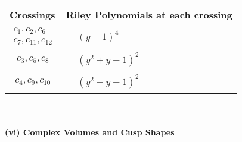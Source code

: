 \documentclass[1p]{elsarticle_modified}
\theoremstyle{definition}
\begin{document}
\begin{tabular}{m{50pt}|m{274pt}}
Crossings & \hspace{64pt}Riley Polynomials at each crossing \\
\hline $$\begin{aligned}c_{1},c_{2},c_{6}\\c_{7},c_{11},c_{12}\end{aligned}$$&$\begin{aligned}
&(y-1)^4
\end{aligned}$\\
\hline $$\begin{aligned}c_{3},c_{5},c_{8}\end{aligned}$$&$\begin{aligned}
&(y^2+y-1)^2
\end{aligned}$\\
\hline $$\begin{aligned}c_{4},c_{9},c_{10}\end{aligned}$$&$\begin{aligned}
&(y^2- y-1)^2
\end{aligned}$\\
\hline
\end{tabular}\\~\\
\newpage\flushleft \textbf{(vi) Complex Volumes and Cusp Shapes}
\end{document}
